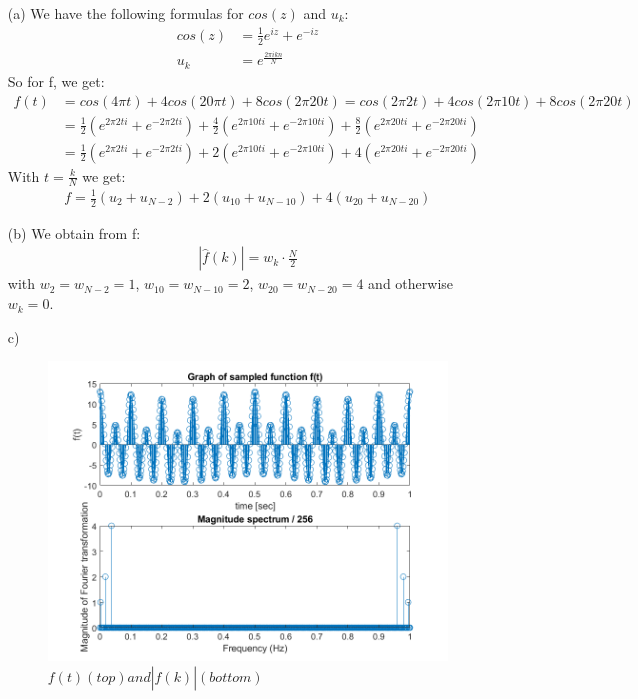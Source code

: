 \documentclass[12pt]{article}
\begin{document}
\begin{itemize}
    \item[(a)] We have the following formulas for $cos(z)$ and $u_k$:
    \begin{align*}
      cos(z) &= \frac{1}{2} e^{iz} + e^{-iz} \\
      u_k &= e^{\frac{2 \pi i k n}{N}}
    \end{align*}
    So for f, we get:
    \begin{align*}
      f(t) &= cos(4\pi t) + 4 cos(20\pi t) + 8 cos(2\pi 20 t) = cos(2\pi 2 t) + 4 cos(2\pi 10 t) + 8 cos(2\pi 20 t)\\
      &= \frac{1}{2} \left( e^{2 \pi 2 t i} + e^{-2 \pi 2 t i} \right) + \frac{4}{2} \left( e^{2 \pi 10 t i} + e^{-2 \pi 10 t i} \right) + \frac{8}{2} \left( e^{2 \pi 20 t i} + e^{-2 \pi 20 t i} \right)\\
      &= \frac{1}{2} \left( e^{2 \pi 2 t i} + e^{-2 \pi 2 t i} \right) + 2 \left( e^{2 \pi 10 t i} + e^{-2 \pi 10 t i} \right) + 4 \left( e^{2 \pi 20 t i} + e^{-2 \pi 20 t i} \right)
    \end{align*}
    With $t=\frac{k}{N}$ we get:
    \begin{align*}
      f = \frac{1}{2} \left(u_2 + u_{N-2} \right) + 2 \left( u_{10} + u_{N-10} \right) + 4 \left(u_{20} + u_{N-20} \right)
    \end{align*}
      \item[(b)] We obtain from f:
      \begin{align*}
        |\hat f(k)|=w_k \cdot \frac{N}{2}
      \end{align*}
      with $w_2=w_{N-2}=1$, $w_{10}=w_{N-10}=2$, $w_{20}=w_{N-20}=4$ and otherwise $w_k=0$.
      \item[c)]
      \begin{figure}[H]
          \centering
          \includegraphics[width=1.1\textwidth]{Sheet3Exercise1.png}
          \caption{$f(t) (top) and |\hat f(k)| (bottom)$}
          \label{abb}
      \end{figure}
\end{itemize}
\end{document}
